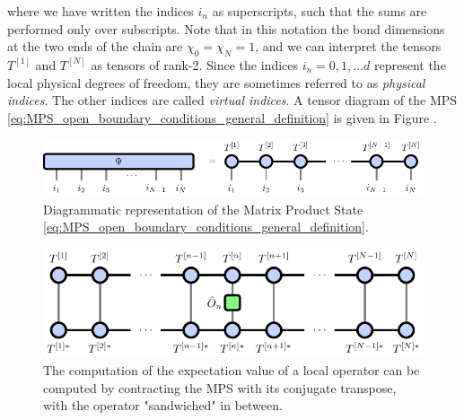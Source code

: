 where we have written the indices $i_n$ as superscripts, such that the sums are performed only over subscripts. Note that in this notation the bond dimensions at the two ends of the chain are $\chi_0 = \chi_{N} = 1$, and we can interpret the tensors $T^{[1]}$ and $T^{[N]}$ as tensors of rank-2. Since the indices $i_n = 0, 1, \dots d$ represent the local physical degrees of freedom, they are sometimes referred to as \textit{physical indices}. The other indices are called \textit{virtual indices}. A tensor diagram of the MPS \eqref{eq:MPS_open_boundary_conditions_general_definition} is given in Figure .\par
\begin{figure}
	\centering
	\includegraphics[scale=1]{figures/tikz/Tensor_Networks/mps_basic/mps_basic.pdf}
	\caption{Diagrammatic representation of the Matrix Product State \ref{eq:MPS_open_boundary_conditions_general_definition}.}
	\label{fig:mps_general}
\end{figure}
\begin{figure}
\centering
\includegraphics[scale=1]{figures/tikz/Tensor_Networks/mps_local_expectation_value/mps_local_expectation_value.pdf}
\caption{The computation of the expectation value of a local operator can be computed by contracting the MPS with its conjugate transpose, with the operator "sandwiched" in between.}
\label{fig:mps_local_expectation_value}
\end{figure}
